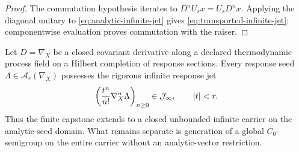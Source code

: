 \begin{proof}
The commutation hypothesis iterates to $D^nU_sx=U_sD^nx$.  Applying the diagonal unitary to \eqref{eq:analytic-infinite-jet} gives \eqref{eq:transported-infinite-jet}; componentwise evaluation proves commutation with the raiser.
\end{proof}

\begin{corollary}
Let $D=\nabla_X$ be a closed covariant derivative along a declared thermodynamic process field on a Hilbert completion of response sections.  Every response seed $\Lambda\in\mathcal A_r(\nabla_X)$ possesses the rigorous infinite response jet
\[
\left(\frac{t^n}{n!}\nabla_X^n\Lambda\right)_{n\ge0}
\in\mathcal J_\infty,
\qquad |t|<r.
\]
Thus the finite capstone extends to a closed unbounded infinite carrier on the analytic-seed domain.  What remains separate is generation of a global $C_0$-semigroup on the entire carrier without an analytic-vector restriction.
\end{corollary}
